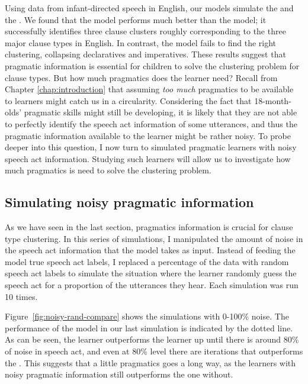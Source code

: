 Using data from infant-directed speech in English, our models simulate the \distlearner{} and the \praglearner{}.
 We found that the \plearnerabbr{} model performs much better than the \dlearnerabbr{} model; it successfully identifies three clause clusters roughly corresponding to the three major clause types in English. In contrast, the \dlearnerabbr{} model fails to find the right clustering, collapsing declaratives and imperatives. These results suggest that pragmatic information is essential for children to solve the clustering problem for clause types. But how much pragmatics does the learner need? Recall from Chapter \ref{chap:introduction} that assuming \emph{too much} pragmatics to be available to learners might catch us in a circularity. Considering the fact that 18-month-olds' pragmatic skills might still be developing, it is likely that they are not able to perfectly identify the speech act information of some utterances, and thus the pragmatic information available to the learner might be rather noisy. To probe deeper into this question, I now turn to simulated pragmatic learners with noisy speech act information. Studying such learners will allow us to investigate how much pragmatics is need to solve the clustering problem. 



\subsection{Simulating noisy pragmatic information} 
\label{sec:engcl:model:noisy}
As we have seen in the last section, pragmatics information is crucial for clause type clustering. In this series of simulations, I manipulated the amount of noise in the speech act information that the \plearnerabbr{} model takes as input. Instead of feeding the model true speech act labels, I replaced a percentage of the data with random speech act labels to simulate the situation where the learner randomly guess the speech act for a proportion of the utterances they hear. Each simulation was run 10 times. 

Figure~\ref{fig:noisy-rand-compare} shows the simulations with 0-100\% noise. The performance of the \dlearnerabbr{} model in our last simulation is indicated by the dotted line. As can be seen, the \plearnerabbr{} learner outperforms the \dlearnerabbr{} learner up until there is around 80\% of noise in speech act, and even at 80\% level there are iterations that outperforms the \dlearnerabbr{}. This suggests that a little pragmatics goes a long way, as the learners with noisy pragmatic information still outperforms the one without. 

